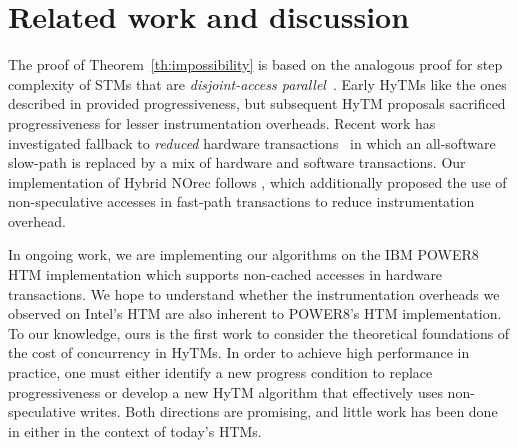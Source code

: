 \section{Related work and discussion}
\label{sec:rel}
%
The proof of Theorem~\ref{th:impossibility} is based on the analogous proof for step complexity of STMs that are \emph{disjoint-access parallel}~\cite{prog15-pact}.
Early HyTMs like the ones described in \cite{damronhytm, kumarhytm} provided progressiveness, but
subsequent HyTM proposals sacrificed progressiveness for lesser instrumentation overheads.
Recent work has investigated fallback to \emph{reduced} hardware transactions~\cite{MS13}
in which an all-software slow-path is replaced by a mix of hardware and software transactions. 
Our implementation of Hybrid NOrec follows \cite{hynorecriegel}, which additionally proposed the use of non-speculative accesses
in fast-path transactions to reduce instrumentation overhead. %

In ongoing work, we are implementing our algorithms on the IBM POWER8 HTM implementation which supports
non-cached accesses in hardware transactions.
We hope to understand whether the instrumentation overheads we observed
on Intel's HTM are also inherent to POWER8's HTM implementation.
To our knowledge, ours is the first work to consider the theoretical foundations of the cost of concurrency in HyTMs.
In order to achieve high performance in practice, one must either identify a new progress condition to replace progressiveness or develop a new HyTM algorithm that effectively uses non-speculative writes.
Both directions are promising, and little work has been done in either in the context of today's HTMs.